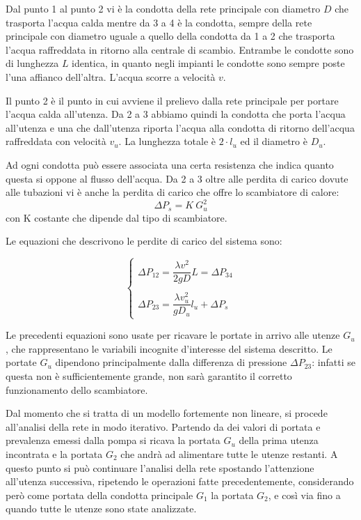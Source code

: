 \documentclass[laurea,oneside,11pt]{USiena_tesiLM}
\begin{document}
Dal punto 1 al punto 2 vi è la condotta della rete principale con diametro $D$ che trasporta l'acqua calda mentre da 3 a 4 è la condotta, sempre della rete principale con diametro uguale a quello della condotta da 1 a 2 che trasporta l'acqua raffreddata in ritorno alla centrale di scambio. Entrambe le  condotte sono di lunghezza $L$ identica, in quanto negli impianti le condotte sono sempre poste l'una affianco dell'altra. L'acqua scorre a velocità $v$.

Il punto 2 è il punto in cui avviene il prelievo dalla rete principale per portare l'acqua calda all'utenza. Da 2 a 3 abbiamo quindi la condotta che porta l'acqua all'utenza e una che dall'utenza riporta l'acqua alla condotta di ritorno dell'acqua raffreddata con velocità $v_u$. La lunghezza totale è $2 \cdot l_u$ ed il diametro è $D_u$.

Ad ogni condotta può essere associata una certa resistenza che  indica quanto questa si oppone al flusso dell'acqua. Da 2 a 3 oltre alle perdita di carico dovute alle tubazioni vi è anche la perdita di carico che offre lo scambiatore di calore:
\begin{equation}
\Delta P_s = K \ G^2_u
\end{equation}
con K costante che dipende dal tipo di scambiatore.

Le equazioni che descrivono le perdite di carico del sistema sono:

\begin{equation}
\begin{cases}
\Delta P_{12} = \dfrac{\lambda v^2}{2 g D} L = \Delta P_{34} \\
\\
\Delta P_{23} = \dfrac{\lambda v_u^2}{ g D_u} l_u + \Delta P_s
\end{cases}
\end{equation}

Le precedenti equazioni sono usate per ricavare le portate in arrivo alle utenze $G_u$, che rappresentano le variabili incognite d'interesse del sistema descritto. Le portate $G_u$ dipendono principalmente dalla differenza di pressione $\Delta P_{23}$: infatti se questa non è sufficientemente grande, non sarà garantito il corretto funzionamento dello scambiatore.

Dal momento che si tratta di un modello fortemente non lineare, si procede all'analisi della rete in modo iterativo. Partendo da dei valori di portata e prevalenza emessi dalla pompa si ricava la portata $G_u$ della prima utenza incontrata e la portata $G_2$ che andrà ad alimentare tutte le utenze restanti. A questo punto si può continuare l'analisi della rete spostando l'attenzione all'utenza successiva, ripetendo le operazioni fatte precedentemente, considerando però come portata della condotta principale $G_1$ la portata $G_2$, e così via fino a quando tutte le utenze sono state analizzate.
\end{document}
